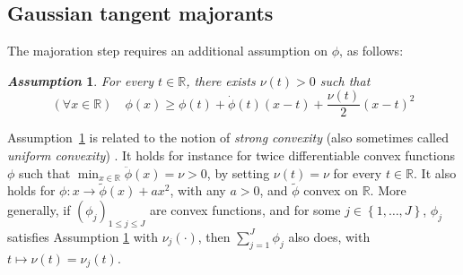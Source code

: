 \documentclass[review]{elsarticle}
\newtheorem{assumption}{\em Assumption}
\newcommand{\bR}{\mathbb{R}}
\begin{document}
\subsection{Gaussian tangent majorants}

The majoration step requires an additional assumption on $\phi$, as follows: 
\begin{assumption}
\label{assump2}
For every $t \in \mathbb{R}$, there exists $\nu(t)>0$ such that
\begin{equation}
(\forall x \in \mathbb{R}) \quad \phi(x) \geq \phi(t) + \dot{\phi}(t) (x-t) + \frac{\nu(t)}{2} (x-t)^2
\end{equation}
\end{assumption}

Assumption~\ref{assump2} is related to the notion of \emph{strong convexity} (also sometimes called \emph{uniform convexity}) \cite{Bauschke2017}. It holds for instance for twice differentiable convex functions $\phi$ such that $\min_{x \in \bR} \ddot{\phi}(x) = \nu > 0$, by setting $\nu(t) = \nu$ for every $t \in \bR$. It also holds for $\phi: x \to \tilde{\phi}(x) + a x^2$, with any $a>0$, and $\tilde{\phi}$ convex on $\bR$. More generally, if $(\phi_j)_{1 \leq j \leq J}$ are convex functions, and for some $j \in \left\{1,\ldots,J\right\}$, $\phi_j$ 
satisfies Assumption \ref{assump2} with $\nu_j(\cdot)$, then $\sum_{j=1}^J \phi_j$ also does, with $t \mapsto \nu(t) = \nu_j(t)$. 

\end{document}
